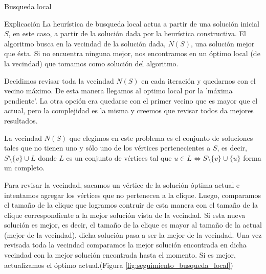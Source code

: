 \begin{section}{Busqueda local}
		\begin{subsection}{Explicación}
			La heurística de busqueda local actua a partir de una solución inicial $S$, en este caso, a partir de la solución dada por la heurística constructiva. El algoritmo busca en la vecindad de la solución dada, $N(S)$, una solución mejor que ésta. Si no encuentra ninguna mejor, nos encontramos en un óptimo local (de la vecindad) que tomamos como solución del algoritmo.
						
			Decidimos revisar toda la vecindad $N(S)$ en cada iteración y quedarnos con el vecino máximo. De esta manera llegamos al optimo local por la 'máxima pendiente'. La otra opción era quedarse con el primer vecino que es mayor que el actual, pero la complejidad es la misma y creemos que revisar todos da mejores resultados.
			
			La vecindad $N(S)$ que elegimos en este problema es el conjunto de soluciones tales que no tienen uno y sólo uno de los vértices pertenecientes a $S$, es decir, $S \setminus \{v\} \cup L$ donde $L$ es un conjunto de vértices tal que $u \in L \Longleftrightarrow S \setminus \{v\} \cup \{u\}$ forma un completo.

			Para revisar la vecindad, sacamos un vértice de la solución óptima actual e intentamos agregar los vértices que no pertenecen a la clique. Luego, comparamos el tamaño de la clique que logramos contruir de esta manera con el tamaño de la clique correspondiente a la mejor solución vista de la vecindad. Si esta nueva solución es mejor, es decir, el tamaño de la clique es mayor al tamaño de la actual (mejor de la vecindad), dicha solución pasa a ser la mejor de la vecindad. Una vez revisada toda la vecindad comparamos la mejor solución encontrada en dicha vecindad con la mejor solución encontrada hasta el momento. Si es mejor, actualizamos el óptimo actual.(Figura \ref{fig:seguimiento_busqueda_local})


\end{subsection}
\end{section}
